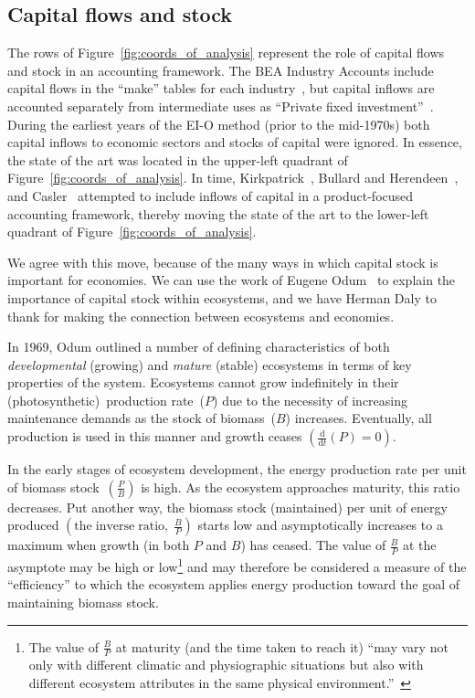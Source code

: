 \subsection{Capital flows and stock}
\label{sec:capital_stock}

The rows of Figure~\ref{fig:coords_of_analysis}
represent the role of capital flows and stock in an accounting framework.
The BEA Industry Accounts 
include capital flows in the ``make''
tables for each industry~\cite[Table~1]{Streitwieser:2011aa}, 
but capital inflows are accounted separately 
from intermediate uses as 
``Private fixed invest­ment''~\cite[Table~2]{Streitwieser:2011aa}.
During the earliest years of the EI-O method 
(prior to the mid-1970s) 
both capital inflows to economic sectors 
and stocks of capital were ignored.
In essence, the state of the art was located in the upper-left quadrant
of Figure~\ref{fig:coords_of_analysis}.
In time, Kirkpatrick~\cite{Kirkpatrick:1974te}, 
Bullard and Herendeen~\cite{Bullard-III:1975aa},
and Casler~\cite{Casler:1983uy} attempted to 
include inflows of capital in a product-focused
accounting framework, thereby moving the state of the art 
to the lower-left quadrant of Figure~\ref{fig:coords_of_analysis}.

We agree with this move, because of the many ways in which
capital stock is important for economies.
We can use the work of Eugene Odum~\cite{Odum1969}
to explain the importance of capital stock
within ecosystems,
and we have Herman Daly to thank
for making the connection between
ecosystems and economies.\cite{Daly1995}

In 1969, Odum outlined a number of 
defining characteristics of both \emph{developmental}
(growing) and \emph{mature} (stable) ecosystems in terms of key
properties of the system.\cite{Odum1969}
Ecosystems cannot
grow indefinitely in their (photosynthetic)~production rate~($P$)
due to the necessity of increasing maintenance
demands as the stock of biomass~($B$) increases.
Eventually, all production is used in this manner
and growth ceases 
$\left(\frac{\mathrm{d}}{\mathrm{d}t}(P) = 0\right)$.

In the early stages of ecosystem development,
the energy production rate 
per unit of biomass stock~$\left( \frac{P}{B} \right)$
is high.
As the ecosystem approaches maturity,
this ratio decreases.
Put another way,
the biomass stock (maintained) per unit of energy produced
$\left( \mathrm{the \; inverse \; ratio, \;} \frac{B}{P} \right)$
starts low and asymptotically increases to a maximum
when growth (in both $P$ and $B$) has ceased. 
The value of $\frac{B}{P}$ at the asymptote may be high or low\footnote{The
	value of $\frac{B}{P}$ at maturity (and the time taken to reach it)
	``may vary not only with different climatic 
	and physiographic situations but also with
	different ecosystem attributes in the same physical 
	environment.''~\cite[p.263]{Odum1969}}
and may therefore be considered a measure of 
the ``efficiency'' to which the ecosystem applies
energy production toward
the goal of maintaining biomass stock.
 
